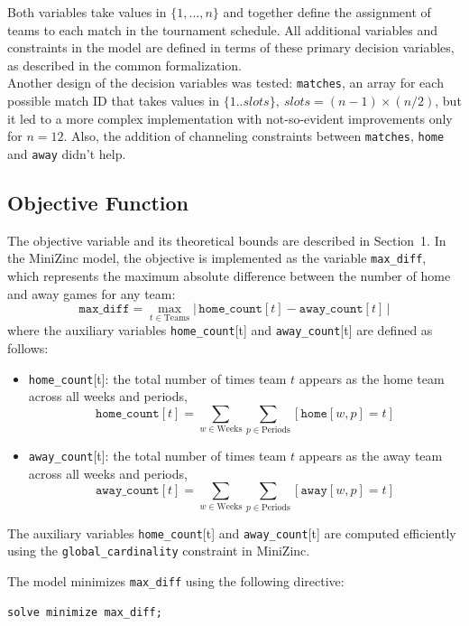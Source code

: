 \documentclass[11pt]{article}
\begin{document}
Both variables take values in $\{1, \ldots, n\}$ and together define the assignment of teams to each match in the tournament schedule. All additional variables and constraints in the model are defined in terms of these primary decision variables, as described in the common formalization. \\
Another design of the decision variables was tested: \texttt{matches}, an array for each possible match ID that takes values in $\{1..slots\},\ slots = (n-1)\times(n/2)$, but it led to a more complex implementation with not-so-evident improvements only for $n=12$. Also, the addition of channeling constraints between \texttt{matches}, \texttt{home} and \texttt{away} didn't help.

\subsection{Objective Function}

The objective variable and its theoretical bounds are described in Section~1. In the MiniZinc model, the objective is implemented as the variable \texttt{max\_diff}, which represents the maximum absolute difference between the number of home and away games for any team:
\[
\texttt{max\_diff} = \max_{t \in \text{Teams}} \left|\,\texttt{home\_count}[t] - \texttt{away\_count}[t]\,\right|
\]
where the auxiliary variables \texttt{home\_count}[t] and \texttt{away\_count}[t] are defined as follows:
\begin{itemize}
    \item \texttt{home\_count}[t]: the total number of times team $t$ appears as the home team across all weeks and periods,
    \[
    \texttt{home\_count}[t] = \sum_{w \in \text{Weeks}} \sum_{p \in \text{Periods}} [\texttt{home}[w,p] = t]
    \]
    \item \texttt{away\_count}[t]: the total number of times team $t$ appears as the away team across all weeks and periods,
    \[
    \texttt{away\_count}[t] = \sum_{w \in \text{Weeks}} \sum_{p \in \text{Periods}} [\texttt{away}[w,p] = t]
    \]
\end{itemize}

The auxiliary variables \texttt{home\_count}[t] and \texttt{away\_count}[t] are computed efficiently using the \texttt{global\_cardinality} constraint in MiniZinc.

The model minimizes \texttt{max\_diff} using the following directive:
\begin{verbatim}
solve minimize max_diff;
\end{verbatim}
\end{document}
